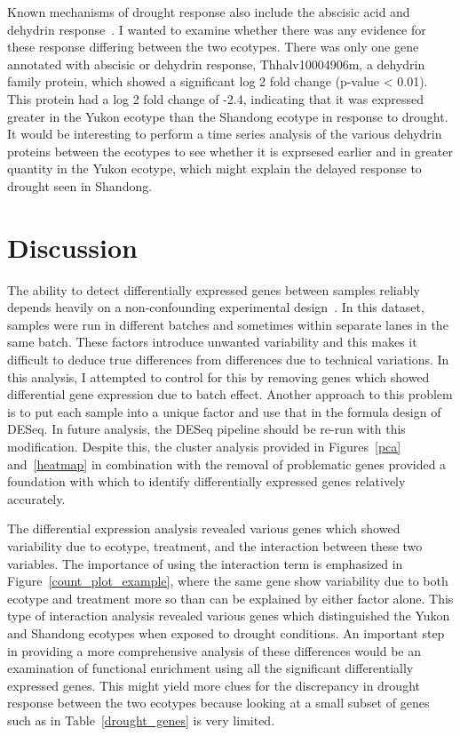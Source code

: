 \documentclass[12pt]{article}
\begin{document}
	Known mechanisms of drought response also include the abscisic acid and dehydrin response~\cite{farrant1996presence}. I wanted to examine whether there was any evidence for these response differing between the two ecotypes. There was only one gene annotated with abscisic or dehydrin response, Thhalv10004906m, a dehydrin family protein, which showed a significant log 2 fold change (p-value < 0.01). This protein had a log 2 fold change of -2.4, indicating that it was expressed greater in the Yukon ecotype than the Shandong ecotype in response to drought. It would be interesting to perform a time series analysis of the various dehydrin proteins between the ecotypes to see whether it is exprsesed earlier and in greater quantity in the Yukon ecotype, which might explain the delayed response to drought seen in Shandong.
	
	\section{Discussion}
	The ability to detect differentially expressed genes between samples reliably depends heavily on a non-confounding experimental design~\cite{leek2010tackling}. In this dataset, samples were run in different batches and sometimes within separate lanes in the same batch. These factors introduce unwanted variability and this makes it difficult to deduce true differences from differences due to technical variations. In this analysis, I attempted to control for this by removing genes which showed differential gene expression due to batch effect. Another approach to this problem is to put each sample into a unique factor and use that in the formula design of DESeq. In future analysis, the DESeq pipeline should be re-run with this modification. Despite this, the cluster analysis provided in Figures~\ref{pca} and~\ref{heatmap} in combination with the removal of problematic genes provided a foundation with which to identify differentially expressed genes relatively accurately.
	
	The differential expression analysis revealed various genes which showed variability due to ecotype, treatment, and the interaction between these two variables. The importance of using the interaction term is emphasized in Figure~\ref{count_plot_example}, where the same gene show variability due to both ecotype and treatment more so than can be explained by either factor alone. This type of interaction analysis revealed various genes which distinguished the Yukon and Shandong ecotypes when exposed to drought conditions. An important step in providing a more comprehensive analysis of these differences would be an examination of functional enrichment using all the significant differentially expressed genes. This might yield more clues for the discrepancy in drought response between the two ecotypes because looking at a small subset of genes such as in Table~\ref{drought_genes} is very limited. 
	
\end{document}
